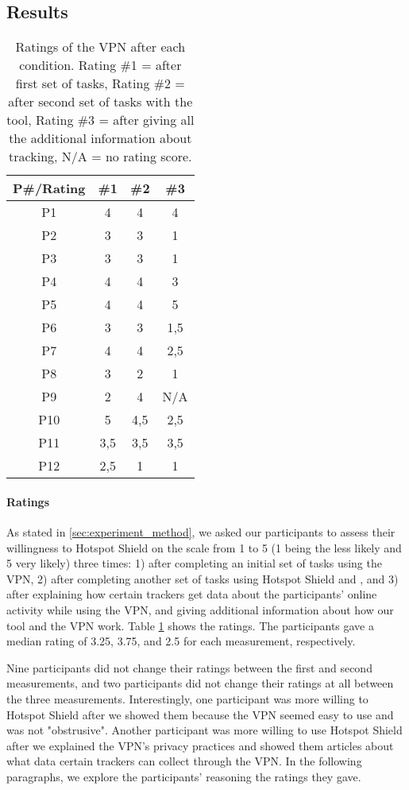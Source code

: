 \subsection{Results}\label{sec:results}

\begin{table}[h!]
\centering
\begin{tabular}{|c c c c|} 
 \hline
P\#/Rating & \#1 & \#2 & \#3 \\
\hline
P1 & 4 & 4 & 4\\
P2 & 3 & 3 & 1\\
P3 & 3 & 3 & 1\\
P4 & 4 & 4 & 3\\
P5 & 4 & 4 & 5\\
P6 & 3 & 3 & 1,5\\
P7 & 4 & 4 & 2,5\\
P8 & 3 & 2 & 1\\
P9 & 2 & 4 & N/A\\
P10 & 5 & 4,5 & 2,5\\
P11 & 3,5 & 3,5 & 3,5\\
P12 & 2,5 & 1 & 1 \\
 \hline
\end{tabular}
\caption{Ratings of the VPN after each condition. Rating \#1 = after first set of tasks, Rating \#2 = after second set of tasks with the tool, Rating \#3 = after giving all the additional information about tracking, N/A = no rating score.}
\label{tab:ratings}
\end{table}

\paragraph{Ratings}

As stated in \ref{sec:experiment_method}, we asked our participants to assess their
willingness to Hotspot Shield on the scale from 1 to 5 (1 being the less likely
and 5 very likely) three times: 1) after completing an initial set of tasks using the
VPN, 2) after completing another set of tasks using Hotspot Shield and \tool, and
3) after explaining how certain trackers get data about the participants' online activity while using the VPN, and giving additional information about how our tool and the VPN work. Table \ref{tab:ratings} shows the ratings. The participants gave a median rating of 3.25, 3.75, and 2.5 for each measurement, respectively.

Nine participants did not change their ratings between the first and second measurements, and two participants did not change their ratings at
all between the three measurements. Interestingly, one participant was more willing to Hotspot Shield after we showed them \tool because the VPN seemed easy to use and was not "obstrusive". Another participant was more willing to
use Hotspot Shield after we explained the VPN's privacy practices and showed them articles about what data certain trackers can collect through the VPN. In the following paragraphs, we explore the participants' reasoning the ratings they gave.

